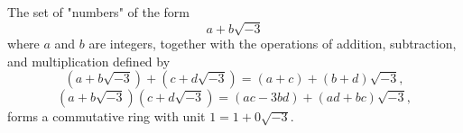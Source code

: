 The set of "numbers" of the form
$$a + b\sqrt{-3}$$
where $a$ and $b$ are integers, together with the operations of addition, subtraction, and multiplication defined by
$$(a + b\sqrt{-3}) + (c + d\sqrt{-3}) = (a+c) + (b+d)\sqrt{-3},$$
$$(a + b\sqrt{-3})(c + d\sqrt{-3}) = (ac - 3bd) + (ad + bc)\sqrt{-3},$$
forms a commutative ring with unit $1 = 1 + 0\sqrt{-3}$.
